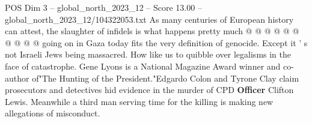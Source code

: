 \begin{textsample}{POS Dim 3 – global\_north\_2023\_12 – Score 13.00 – global\_north\_2023\_12/104322053.txt}
As many centuries of European history can attest, the slaughter of infidels is what happens pretty much @ @ @ @ @ @ @ @ @ @ going on in Gaza today fits the very definition of genocide.
Except it ' s not Israeli Jews being massacred.
How like us to quibble over legalisms in the face of catastrophe.
Gene Lyons is a National Magazine Award winner and co-author of"The Hunting of the President."Edgardo Colon and Tyrone Clay claim prosecutors and detectives hid evidence in the murder of CPD \textbf{Officer} Clifton Lewis.
Meanwhile a third man serving time for the killing is making new allegations of misconduct.

\end{textsample}
